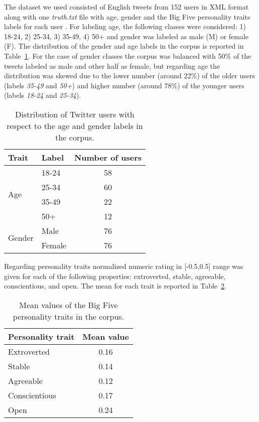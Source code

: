 \documentclass[10pt, a4paper]{article}
\begin{document}
The dataset we used consisted of English tweets from 152 users in XML format along with one \textit{truth.txt} file with age, gender and the Big Five personality traits labels for each user \citep{dataset2015}. For labeling age, the following classes were considered: 1) 18-24, 2) 25-34, 3) 35-49, 4) 50+ and gender was labeled as male (M) or female (F). The distribution of the gender and age labels in the corpus is reported in Table~\ref{tab:narrow-table-1}. For the case of gender classes the corpus was balanced with 50\% of the tweets labeled as male and other half as female, but regarding age the      
distribution was skewed due to the lower number (around 22\%) of the older users (labels \textit{35-49} and \textit{50+}) and higher number (around 78\%) of the younger users (labels \textit{18-24} and \textit{25-34}).
\begin{table}[h]
\caption{Distribution of Twitter users with respect to the age and gender labels in the corpus.}
\label{tab:narrow-table-1}
\vspace{-6mm}
\begin{center}
\begin{tabular}{llc}
\toprule
Trait & Label & Number of users\\
\midrule
\multirow{4}{*}{Age}
		&18-24   & 58\\
    &25-34   & 60\\
    &35-49   & 22\\
    &50+   & 12\\
\midrule
\multirow{2}{*}{Gender}
		&Male   & 76\\
    &Female & 76\\
\bottomrule
\end{tabular}
\end{center}
\end{table}

Regarding personality traits normalized numeric rating in [-0.5,0.5] range was given for each of the following properties:  extroverted, stable, agreeable, conscientious, and open. The mean for each trait is reported in Table~\ref{tab:narrow-table-2}.
\begin{table}[h]
\caption{Mean values of the Big Five personality traits in the corpus.}
\label{tab:narrow-table-2}
\vspace{-6mm}
\begin{center}
\begin{tabular}{lc}
\toprule
Personality trait & Mean value\\
\midrule
Extroverted  & 0.16\\
Stable   & 0.14\\
Agreeable  & 0.12\\
Conscientious     & 0.17\\
Open     & 0.24\\
\bottomrule
\end{tabular}
\end{center}
\end{table}
\end{document}
